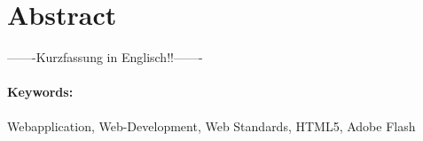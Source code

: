\section*{Abstract}\thispagestyle{empty}
-------Kurzfassung in Englisch!!-------
\\ \vfill
\paragraph*{Keywords:} Webapplication, Web-Development, Web Standards, HTML5,
Adobe Flash